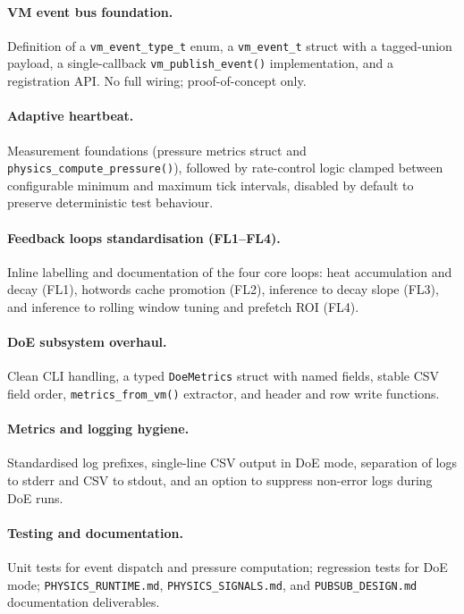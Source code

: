 \paragraph{VM event bus foundation.}
Definition of a \texttt{vm\_event\_type\_t} enum, a \texttt{vm\_event\_t} struct with a
tagged-union payload, a single-callback \texttt{vm\_publish\_event()} implementation, and
a registration API. No full wiring; proof-of-concept only.

\paragraph{Adaptive heartbeat.}
Measurement foundations (pressure metrics struct and
\texttt{physics\_compute\_pressure()}), followed by rate-control logic clamped between
configurable minimum and maximum tick intervals, disabled by default to preserve
deterministic test behaviour.

\paragraph{Feedback loops standardisation (FL1--FL4).}
Inline labelling and documentation of the four core loops: heat accumulation and decay
(FL1), hotwords cache promotion (FL2), inference to decay slope (FL3), and inference
to rolling window tuning and prefetch ROI (FL4).

\paragraph{DoE subsystem overhaul.}
Clean CLI handling, a typed \texttt{DoeMetrics} struct with named fields, stable CSV
field order, \texttt{metrics\_from\_vm()} extractor, and header and row write functions.

\paragraph{Metrics and logging hygiene.}
Standardised log prefixes, single-line CSV output in DoE mode, separation of logs to
stderr and CSV to stdout, and an option to suppress non-error logs during DoE runs.

\paragraph{Testing and documentation.}
Unit tests for event dispatch and pressure computation; regression tests for DoE mode;
\texttt{PHYSICS\_RUNTIME.md}, \texttt{PHYSICS\_SIGNALS.md}, and \texttt{PUBSUB\_DESIGN.md}
documentation deliverables.

